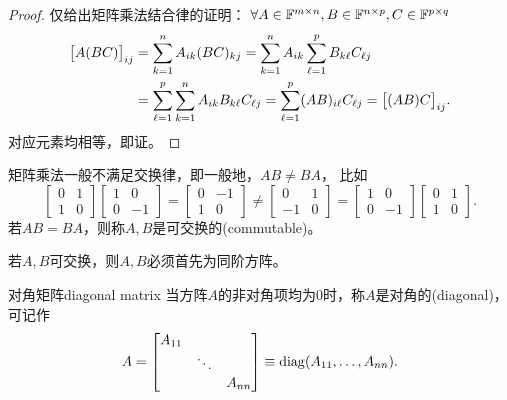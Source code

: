 \begin{proof}
	仅给出矩阵乘法结合律的证明：
	$\forall A\in\mathbb F^{m\times n},B\in\mathbb F^{n\times p},C\in\mathbb F^{p\times q}$
	\begin{align*}
		\bigl[A(BC)\bigr]_{ij}&=\sum_{k=1}^nA_{ik}(BC)_{kj}=\sum_{k=1}^nA_{ik}\sum_{\ell=1}^pB_{k\ell}C_{\ell j}\\
		&=\sum_{\ell=1}^p\sum_{k=1}^nA_{ik}B_{k\ell}C_{\ell j}=\sum_{\ell=1}^p(AB)_{i\ell}C_{\ell j}=\bigl[(AB)C\bigr]_{ij}.
	\end{align*}
	对应元素均相等，即证。
\end{proof}

\begin{remark}
	矩阵乘法一般不满足交换律，即一般地，$AB\neq BA$，
	比如
	\[
		\begin{bmatrix}
			0&1\\1&0
		\end{bmatrix}\begin{bmatrix}
			1&0\\0&-1
		\end{bmatrix}=\begin{bmatrix}
			0&-1\\1&0
		\end{bmatrix}\neq\begin{bmatrix}
			0&1\\-1&0
		\end{bmatrix}=\begin{bmatrix}
			1&0\\0&-1
		\end{bmatrix}\begin{bmatrix}
			0&1\\1&0
		\end{bmatrix}.
	\]
	若$AB=BA$，则称$A,B$是可交换的(commutable)。
\end{remark}

\begin{corollary}
	若$A,B$可交换，则$A,B$必须首先为同阶方阵。
\end{corollary}

\begin{definition}
	{对角矩阵}{diagonal matrix}
	当方阵$A$的非对角项均为0时，称$A$是对角的(diagonal)，可记作
	\begin{equation}
		A=\begin{bmatrix}
			A_{11}\\ &\ddots\\ &&A_{nn}
		\end{bmatrix}\equiv\operatorname{diag}(A_{11},\ldots,A_{nn}).
	\end{equation}
\end{definition}

